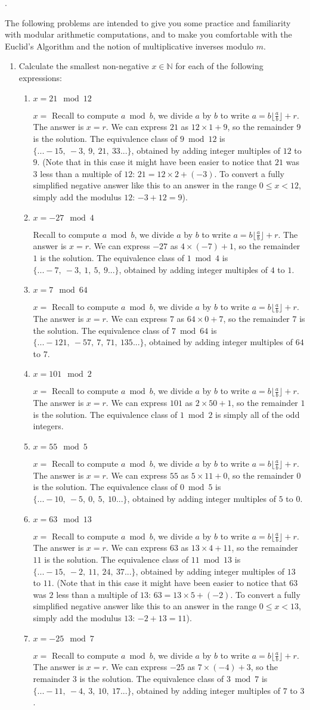 \documentclass[11pt, preview]{standalone} %
\newcommand{\N}{\mathbb{N}}
\newcommand{\modcomphint}{Recall to compute $a \bmod b$, we divide $a$ by $b$ to write $a = b\lfloor \frac{a}{b} \rfloor + r$. The answer is $x = r$.}
\newcommand{\modsol}[4]{We can express $#1$ as $#2 \times #4 + #3$, so the remainder $#3$ is the solution.}
\newcommand{\equivclass}[3]{The equivalence class of $#1 \bmod #2$ is $\{...#3...\}$, obtained by adding integer multiples of $#2$ to $#1$.}
\newcommand{\negans}[5]{(Note that in this case it might have been easier to notice that $#1$ was $#4$ less than a multiple of $#2$: $#1 = #2 \times #3 + (-#4)$. To convert a fully simplified negative answer like this to an answer in the range $0 \leq x < #2$, simply add the modulus $#2$: $-#4 + #2 = #5$).}
\begin{document}
.

The following problems are intended to give you some practice and familiarity with modular arithmetic computations, and to make you comfortable with the Euclid's Algorithm and the notion of multiplicative inverses modulo $m$. 
\begin{enumerate}
\item Calculate the smallest non-negative $x \in \N$ for each of the following expressions:
\begin{enumerate}
\item $x = 21 \mod 12$ 
\begin{Freeform}{9}
$x =$ 
\Hint \modcomphint 
\Solution \modsol{21}{12}{9}{1} \equivclass{9}{12}{-15,\ -3,\ 9,\ 21,\ 33} \negans{21}{12}{2}{3}{9}
\end{Freeform}

\item $x = -27 \mod 4$
\begin{Freeform}{1}
\Hint \modcomphint
\Solution \modsol{-27}{4}{1}{(-7)} \equivclass{1}{4}{-7,\ -3,\ 1,\ 5,\ 9}
\end{Freeform}

\item $x = 7 \mod 64$ 
\begin{Freeform}{7}
$x =$ 
\Hint \modcomphint
\Solution \modsol{7}{64}{7}{0} \equivclass{7}{64}{-121,\ -57,\ 7,\ 71,\ 135}
\end{Freeform}

\item $x = 101 \mod 2$ 
\begin{Freeform}{1}
$x =$ 
\Hint \modcomphint
\Solution \modsol{101}{2}{1}{50} The equivalence class of $1 \bmod 2$ is simply all of the odd integers.
\end{Freeform}

\item $x = 55 \mod 5$
\begin{Freeform}{0}
$x =$ 
\Hint \modcomphint
\Solution \modsol{55}{5}{0}{11} \equivclass{0}{5}{-10,\ -5,\ 0,\ 5,\ 10}
\end{Freeform}

\item $x = 63 \mod 13$
\begin{Freeform}{11}
$x =$ 
\Hint \modcomphint
\Solution \modsol{63}{13}{11}{4} \equivclass{11}{13}{-15,\ -2,\ 11,\ 24,\ 37} \negans{63}{13}{5}{2}{11}
\end{Freeform}

\item $x = -25 \mod 7$
\begin{Freeform}{3}
$x =$
\Hint \modcomphint
\Solution \modsol{-25}{7}{3}{(-4)} \equivclass{3}{7}{-11,\ -4,\ 3,\ 10,\ 17}
\end{Freeform}


\end{enumerate}
\end{enumerate}
\end{document}
